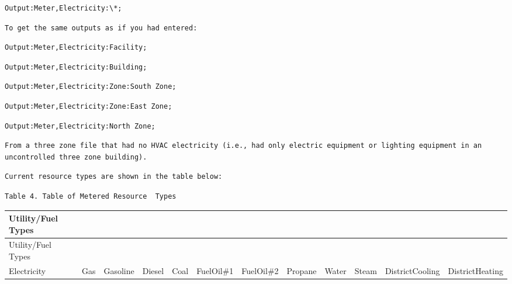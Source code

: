 \begin{lstlisting}
Output:Meter,Electricity:\*;
\end{lstlisting}

\begin{lstlisting}
To get the same outputs as if you had entered:
\end{lstlisting}

\begin{lstlisting}
Output:Meter,Electricity:Facility;
\end{lstlisting}

\begin{lstlisting}
Output:Meter,Electricity:Building;
\end{lstlisting}

\begin{lstlisting}
Output:Meter,Electricity:Zone:South Zone;
\end{lstlisting}

\begin{lstlisting}
Output:Meter,Electricity:Zone:East Zone;
\end{lstlisting}

\begin{lstlisting}
Output:Meter,Electricity:North Zone;
\end{lstlisting}

\begin{lstlisting}
From a three zone file that had no HVAC electricity (i.e., had only electric equipment or lighting equipment in an uncontrolled three zone building).
\end{lstlisting}

\begin{lstlisting}
Current resource types are shown in the table below:
\end{lstlisting}

\begin{lstlisting}
Table 4. Table of Metered Resource  Types
\end{lstlisting}

\begin{longtable}[c]{p{0.5in}p{0.5in}p{0.5in}p{0.5in}p{0.5in}p{0.5in}p{0.5in}p{0.5in}p{0.5in}p{0.5in}p{0.5in}p{0.5in}}
\toprule 
Utility/Fuel Types \tabularnewline
\midrule
\endfirsthead

\toprule 
Utility/Fuel Types \tabularnewline
\midrule
\endhead

Electricity & Gas & Gasoline & Diesel & Coal & FuelOil\#1 & FuelOil\#2 & Propane & Water & Steam & DistrictCooling & DistrictHeating \tabularnewline
\bottomrule
\end{longtable}

